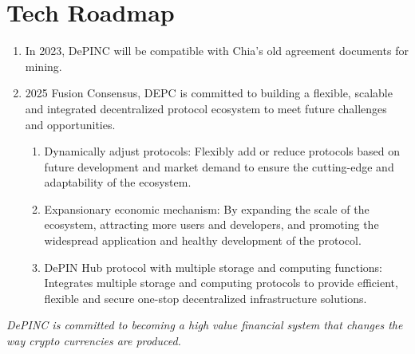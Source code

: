 \chapter{Tech Roadmap}
\begin{enumerate}
    \item In 2023, DePINC will be compatible with Chia's old agreement documents for mining.
    \item 2025 Fusion Consensus, DEPC is committed to building a flexible, scalable and integrated decentralized protocol ecosystem to meet future challenges and opportunities.
    \begin{enumerate}
        \item Dynamically adjust protocols: Flexibly add or reduce protocols based on future development and market demand to ensure the cutting-edge and adaptability of the ecosystem.
        \item Expansionary economic mechanism: By expanding the scale of the ecosystem, attracting more users and developers, and promoting the widespread application and healthy development of the protocol.
        \item DePIN Hub protocol with multiple storage and computing functions: Integrates multiple storage and computing protocols to provide efficient, flexible and secure one-stop decentralized infrastructure solutions.
    \end{enumerate}
\end{enumerate}
\bigskip
\begin{flushleft}
    \textit{DePINC is committed to becoming a high value financial system that changes the way crypto currencies are produced.}
\end{flushleft}

